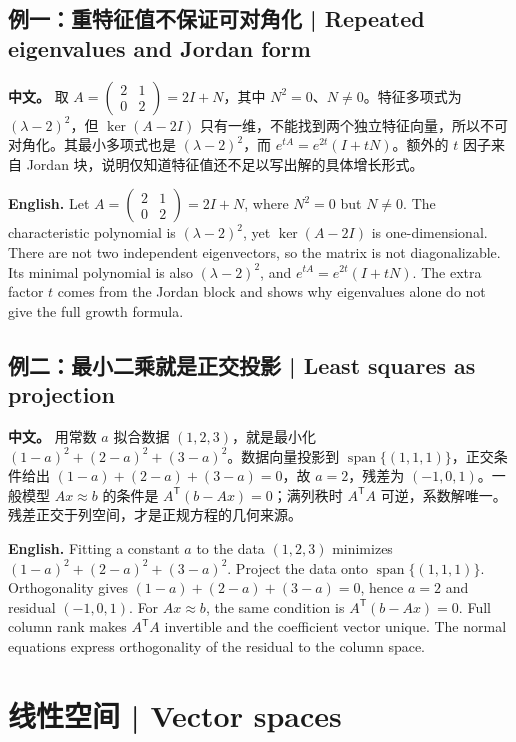 \documentclass[UTF8,11pt,a4paper]{ctexart}
\newcommand{\APS}[2]{\par\noindent\textbf{中文。} #1\par\noindent\textbf{English.} #2\par\smallskip}
\begin{document}
\subsection*{例一：重特征值不保证可对角化 | Repeated eigenvalues and Jordan form}
\APS{取 $A=\left(\begin{smallmatrix}2&1\\0&2\end{smallmatrix}\right)=2I+N$，其中 $N^2=0$、$N\ne0$。特征多项式为 $(\lambda-2)^2$，但 $\ker(A-2I)$ 只有一维，不能找到两个独立特征向量，所以不可对角化。其最小多项式也是 $(\lambda-2)^2$，而 $e^{tA}=e^{2t}(I+tN)$。额外的 $t$ 因子来自 Jordan 块，说明仅知道特征值还不足以写出解的具体增长形式。}{Let $A=\left(\begin{smallmatrix}2&1\\0&2\end{smallmatrix}\right)=2I+N$, where $N^2=0$ but $N\ne0$. The characteristic polynomial is $(\lambda-2)^2$, yet $\ker(A-2I)$ is one-dimensional. There are not two independent eigenvectors, so the matrix is not diagonalizable. Its minimal polynomial is also $(\lambda-2)^2$, and $e^{tA}=e^{2t}(I+tN)$. The extra factor $t$ comes from the Jordan block and shows why eigenvalues alone do not give the full growth formula.}
\subsection*{例二：最小二乘就是正交投影 | Least squares as projection}
\APS{用常数 $a$ 拟合数据 $(1,2,3)$，就是最小化 $(1-a)^2+(2-a)^2+(3-a)^2$。数据向量投影到 $\operatorname{span}\{(1,1,1)\}$，正交条件给出 $(1-a)+(2-a)+(3-a)=0$，故 $a=2$，残差为 $(-1,0,1)$。一般模型 $Ax\approx b$ 的条件是 $A^{\mathsf T}(b-Ax)=0$；满列秩时 $A^{\mathsf T}A$ 可逆，系数解唯一。残差正交于列空间，才是正规方程的几何来源。}{Fitting a constant $a$ to the data $(1,2,3)$ minimizes $(1-a)^2+(2-a)^2+(3-a)^2$. Project the data onto $\operatorname{span}\{(1,1,1)\}$. Orthogonality gives $(1-a)+(2-a)+(3-a)=0$, hence $a=2$ and residual $(-1,0,1)$. For $Ax\approx b$, the same condition is $A^{\mathsf T}(b-Ax)=0$. Full column rank makes $A^{\mathsf T}A$ invertible and the coefficient vector unique. The normal equations express orthogonality of the residual to the column space.}

\setcounter{section}{5}
\section[线性空间]{线性空间 | Vector spaces}
\end{document}
